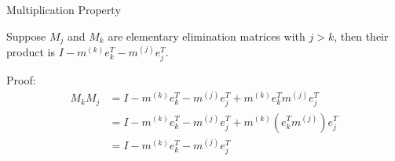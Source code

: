 \documentclass[10pt]{beamer}
\begin{document}

\begin{frame}[shrink]{Multiplication Property}

\begin{theorem}
    Suppose $M_j$ and $M_k$ are elementary elimination matrices with $j>k$,
    then their product is $I - m^{(k)}e_k^T - m^{(j)} e_j^T$. 
\end{theorem}

    Proof: 
    \begin{align*}
      M_k M_j & = I - m^{(k)} e_k^T - m^{(j)} e_j^T + m^{(k)} e_k^T m^{(j)} e_j^T\\
    & = I - m^{(k)} e_k^T - m^{(j)} e_j^T + m^{(k)} (e_k^T m^{(j)}) e_j^T\\
    & = I - m^{(k)} e_k^T - m^{(j)} e_j^T
    \end{align*}
    
\end{frame}


\end{document}
